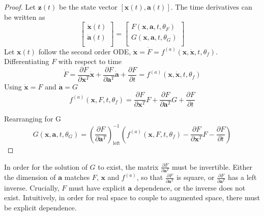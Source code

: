 \documentclass{article}
\theoremstyle{remark}
\theoremstyle{definition}
\begin{document}
\begin{proof}
Let $\mathbf{z}(t)$ be the state vector $[\mathbf{x}(t), \mathbf{a}(t)]$. The time derivatives can be written as
\begin{equation}
\begin{bmatrix}
\dot{\mathbf{x}}(t)\\
\dot{\mathbf{a}}(t)\\
\end{bmatrix}
=
\begin{bmatrix}
F(\mathbf{x},\mathbf{a}, t, \theta_{F})\\
G(\mathbf{x},\mathbf{a}, t, \theta_{G})\\
\end{bmatrix}
\end{equation}
Let $\mathbf{x}(t)$ follow the second order ODE, $\ddot{\mathbf{x}} = \dot{F} = f^{(a)}(\mathbf{x}, \dot{\mathbf{x}}, t, \theta_{f})$. Differentiating $F$ with respect to time
\begin{equation}
\dot{F} = \frac{\partial F}{\partial \mathbf{x}^{T}}\dot{\mathbf{x}} + \frac{\partial F}{\partial \mathbf{a}^{T}}\dot{\mathbf{a}} + \frac{\partial F}{\partial t}
=
f^{(a)}(\mathbf{x}, \dot{\mathbf{x}}, t, \theta_{f})
\end{equation}
Using $\dot{\mathbf{x}} = F$ and $\dot{\mathbf{a}} = G$
\begin{equation}
f^{(a)}(\mathbf{x}, F, t, \theta_{f})
=
\frac{\partial F}{\partial \mathbf{x}^{T}}F + \frac{\partial F}{\partial \mathbf{a}^{T}}G + \frac{\partial F}{\partial t}
\end{equation}

Rearranging for G
\begin{equation}
G(\mathbf{x},\mathbf{a}, t, \theta_{G}) = \left( \frac{\partial F}{\partial \mathbf{a}^{T}}\right)^{-1}_{\text{left}}
\left(
f^{(a)}(\mathbf{x}, F, t, \theta_{f}) - \frac{\partial F}{\partial \mathbf{x}^{T}}F - 
\frac{\partial F}{\partial t}
\right)
\end{equation}
\end{proof}

In order for the solution of $G$ to exist, the matrix $ \displaystyle \frac{\partial F}{\partial \mathbf{a}^{T}}$ must be invertible. Either the dimension of $\mathbf{a}$ matches $F$, $\mathbf{x}$ and $f^{(a)}$, so that $\displaystyle  \frac{\partial F}{\partial \mathbf{a}^{T}}$ is square, or $ \displaystyle \frac{\partial F}{\partial \mathbf{a}^{T}}$ has a left inverse. Crucially, $F$ must have explicit $\mathbf{a}$ dependence, or the inverse does not exist. Intuitively, in order for real space to couple to augmented space, there must be explicit dependence.
\end{document}
